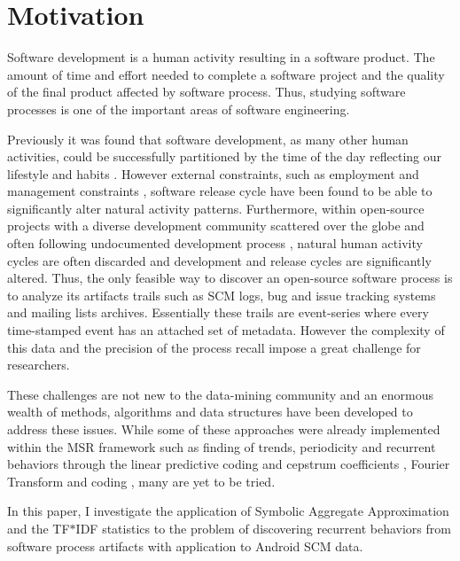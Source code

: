 \documentclass[10pt, conference, compsocconf]{IEEEtran}
\begin{document}
\section{Motivation}
Software development is a human activity resulting in a software product. The 
amount of time and effort needed to complete a software project and the 
quality of the final product affected by software
process. Thus, studying software processes is one of the important areas of
software engineering. 

Previously it was found that software development, as many other human activities,
could be successfully partitioned by the time of the day reflecting our lifestyle and habits
\cite{citeulike:10396459} \cite{citeulike:10392305}. However external constraints, 
such as employment and management constraints \cite{citeulike:6095797}, 
software release cycle \cite{citeulike:2739216} have been found to be able 
to significantly alter natural activity patterns. Furthermore, within open-source 
projects with a diverse development community scattered over the globe and 
often following undocumented development process \cite{citeulike:10377366}, natural human 
activity cycles are often discarded and development and release cycles are significantly altered.
Thus, the only feasible way to discover an open-source software process is to analyze 
its artifacts trails such as SCM logs, bug and issue tracking systems and 
mailing lists archives. Essentially these trails are event-series where every 
time-stamped event has an attached set of metadata. 
However the complexity of this data and the precision of the process 
recall impose a great challenge for researchers.

These challenges are not new to the data-mining community and an enormous wealth 
of methods, algorithms and data structures have been developed to address these issues.
While some of these approaches were already implemented within the MSR framework 
such as finding of trends, periodicity and recurrent behaviors through the linear 
predictive coding and cepstrum coefficients \cite{citeulike:3378725}, 
Fourier Transform \cite{citeulike:10377345} and coding \cite{citeulike:10377366},
many are yet to be tried.

In this paper, I investigate the application of 
Symbolic Aggregate Approximation \cite{citeulike:2821475} and the TF$\ast$IDF 
statistics \cite{citeulike:3056638} to the problem of discovering recurrent 
behaviors from software process artifacts with application to Android SCM data.
\end{document}
